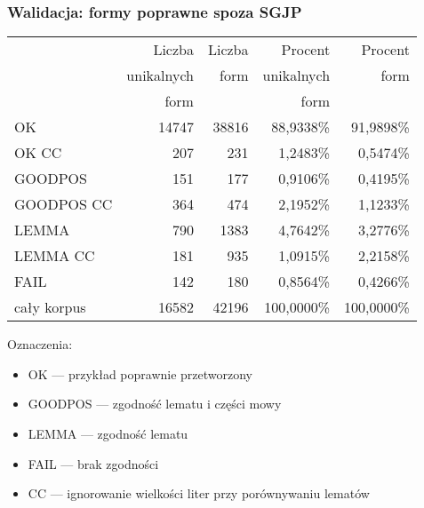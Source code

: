 \documentclass{beamer}
\begin{document}
\begin{frame}
\frametitle{Walidacja: formy poprawne spoza SGJP}
\begin{center}\begin{scriptsize}
\begin{tabular}{l|rrrr}
 & Liczba & Liczba & Procent & Procent\\
 & unikalnych & form & unikalnych & form\\
 & form & & form & \\
\hline
OK & 14747 & 38816 & 88,9338\% & 91,9898\% \\
OK CC & 207 & 231 & 1,2483\% & 0,5474\% \\
GOODPOS & 151 & 177 & 0,9106\% & 0,4195\% \\
GOODPOS CC & 364 & 474 & 2,1952\% & 1,1233\% \\
LEMMA & 790 & 1383 & 4,7642\% & 3,2776\% \\
LEMMA CC & 181 & 935 & 1,0915\% & 2,2158\% \\
FAIL & 142 & 180 & 0,8564\% & 0,4266\% \\
\hline
cały korpus & 16582 & 42196 & 100,0000\% & 100,0000\%\\
\end{tabular}
\end{scriptsize}\end{center}
Oznaczenia:
\begin{itemize}
\item OK --- przykład poprawnie przetworzony
\item GOODPOS --- zgodność lematu i części mowy
\item LEMMA --- zgodność lematu
\item FAIL --- brak zgodności
\item CC --- ignorowanie wielkości liter przy porównywaniu lematów
\end{itemize}
\end{frame}
\end{document}
